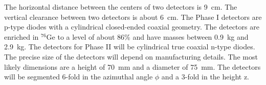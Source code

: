 The horizontal distance between the centers of two detectors is 9~cm. The vertical clearance between two detectors is about 6~cm. The Phase I detectors are p-type diodes with a cylindrical closed-ended coaxial geometry. The detectors are enriched in $^{76}$Ge to a level of about 86\% and have masses between 0.9~kg and 2.9~kg. The detectors for Phase II will be cylindrical true coaxial n-type diodes. The precise size of the detectors will depend on manufacturing details. The most likely dimensions are a height of 70~mm and a diameter of 75~mm. The detectors will be segmented 6-fold in the azimuthal angle $\phi$ and a 3-fold in the height z. 

\begin{figure}[tbhp]
\centering
{}\hfil %

\end{figure}
